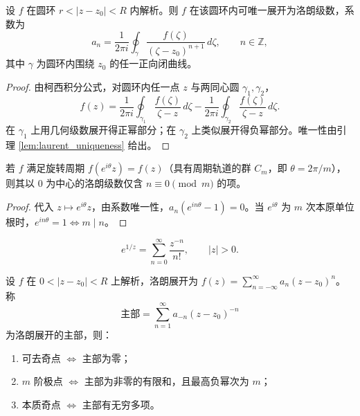 \begin{theorem}[洛朗展开定理]\label{thm:laurent_expansion}
设 $f$ 在圆环 $r < |z - z_0| < R$ 内解析。则 $f$ 在该圆环内可唯一展开为洛朗级数，系数为
\[
a_n = \frac{1}{2\pi i} \oint_{\gamma} \frac{f(\zeta)}{(\zeta - z_0)^{n+1}}\, d\zeta, \qquad n \in \mathbb{Z},
\]
其中 $\gamma$ 为圆环内围绕 $z_0$ 的任一正向闭曲线。
\end{theorem}

\begin{proof}
由柯西积分公式，对圆环内任一点 $z$ 与两同心圆 $\gamma_1, \gamma_2$，
\[
f(z) = \frac{1}{2\pi i}\oint_{\gamma_1} \frac{f(\zeta)}{\zeta - z}\,d\zeta - \frac{1}{2\pi i}\oint_{\gamma_2} \frac{f(\zeta)}{\zeta - z}\,d\zeta.
\]
在 $\gamma_1$ 上用几何级数展开得正幂部分；在 $\gamma_2$ 上类似展开得负幂部分。唯一性由引理 \ref{lem:laurent_uniqueness} 给出。
\end{proof}

\begin{proposition}[旋转周期函数的洛朗展开]\label{prop:laurent_rotation_period}
若 $f$ 满足旋转周期 $f(e^{i\theta} z) = f(z)$（具有周期轨道的群 $C_m$，即 $\theta = 2\pi/m$），则其以 $0$ 为中心的洛朗级数仅含 $n \equiv 0 \pmod{m}$ 的项。
\end{proposition}

\begin{proof}
代入 $z \mapsto e^{i\theta} z$，由系数唯一性，$a_n (e^{in\theta} - 1) = 0$。当 $e^{i\theta}$ 为 $m$ 次本原单位根时，$e^{in\theta} = 1 \iff m \mid n$。
\end{proof}

\begin{example}[$e^{1/z}$ 的洛朗展开]\label{ex:laurent_example}
\[
e^{1/z} = \sum_{n=0}^{\infty} \frac{z^{-n}}{n!}, \qquad |z| > 0.
\]
\end{example}

\begin{proposition}[洛朗级数的奇点分类与主部]\label{prop:laurent_singularity}
设 $f$ 在 $0 < |z-z_0| < R$ 上解析，洛朗展开为 $f(z) = \sum_{n=-\infty}^{\infty} a_n (z-z_0)^n$。称
\[
\text{主部} = \sum_{n=1}^{\infty} a_{-n} (z-z_0)^{-n}
\]
为洛朗展开的主部，则：
\begin{enumerate}[label=(\roman*)]
  \item 可去奇点 $\iff$ 主部为零；
  \item $m$ 阶极点 $\iff$ 主部为非零的有限和，且最高负幂次为 $m$；
  \item 本质奇点 $\iff$ 主部有无穷多项。
\end{enumerate}
\end{proposition}

